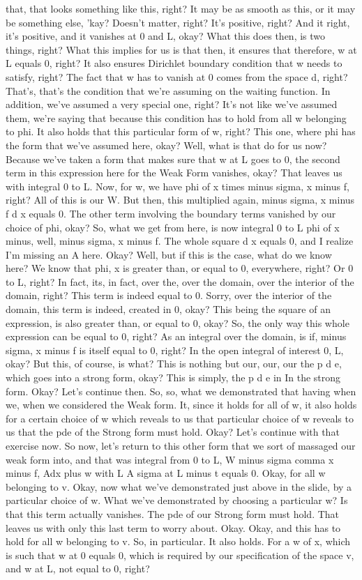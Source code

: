 \documentclass[10pt]{article}
\begin{document}
that, that looks something like this, right? It may be as smooth as this, or it may be something else, 'kay? Doesn't matter, right? It's positive, right? And it right, it's positive, and it vanishes at 0 and L, okay? What this does then, is two things, right? What this implies for us is that then, it ensures that therefore, w at L equals 0, right? It also ensures Dirichlet boundary condition that w needs to satisfy, right? The fact that w has to vanish at 0 comes from the space d, right? That's, that's the condition that we're assuming on the waiting function. In addition, we've assumed a very special one, right? It's not like we've assumed them, we're saying that because this condition has to hold from all w belonging to phi. It also holds that this particular form of w, right? This one, where phi has the form that we've assumed here, okay? Well, what is that do for us now? Because we've taken a form that makes sure that w at L goes to 0, the second term in this expression here for the Weak Form vanishes, okay? That leaves us with integral 0 to L. Now, for w, we have phi of x times minus sigma, x minus f, right? All of this is our W. But then, this multiplied again, minus sigma, x minus f d x equals 0. The other term involving the boundary terms vanished by our choice of phi, okay? So, what we get from here, is now integral 0 to L phi of x minus, well, minus sigma, x minus f. The whole square d x equals 0, and I realize I'm missing an A here. Okay? Well, but if this is the case, what do we know here? We know that phi, x is greater than, or equal to 0, everywhere, right? Or 0 to L, right? In fact, its, in fact, over the, over the domain, over the interior of the domain, right? This term is indeed equal to 0. Sorry, over the interior of the domain, this term is indeed, created in 0, okay? This being the square of an expression, is also greater than, or equal to 0, okay? So, the only way this whole expression can be equal to 0, right? As an integral over the domain, is if, minus sigma, x minus f is itself equal to 0, right? In the open integral of interest 0, L, okay? But this, of course, is what? This is nothing but our, our, our the p d e, which goes into a strong form, okay? This is simply, the p d e in In the strong form. Okay? Let's continue then. So, so, what we demonstrated that having when we, when we considered the Weak form. It, since it holds for all of w, it also holds for a certain choice of w which reveals to us that particular choice of w reveals to us that the pde of the Strong form must hold. Okay? Let's continue with that exercise now. So now, let's return to this other form that we sort of massaged our weak form into, and that was integral from 0 to L, W minus sigma comma x minus f, Adx plus w with L A sigma at L minus t equals 0. Okay, for all w belonging to v. Okay, now what we've demonstrated just above in the slide, by a particular choice of w. What we've demonstrated by choosing a particular w? Is that this term actually vanishes. The pde of our Strong form must hold. That leaves us with only this last term to worry about. Okay. Okay, and this has to hold for all w belonging to v. So, in particular. It also holds. For a w of x, which is such that w at 0 equals 0, which is required by our specification of the space v, and w at L, not equal to 0, right? 
\end{document}
